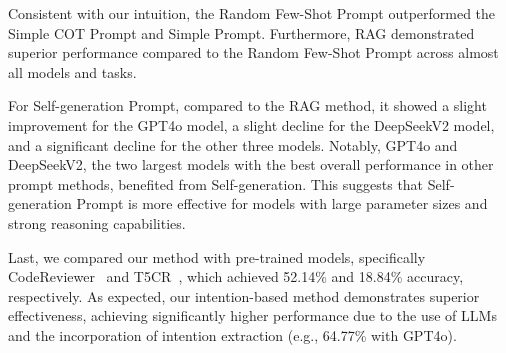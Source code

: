 Consistent with our intuition, the Random Few-Shot Prompt outperformed the Simple COT Prompt and Simple Prompt. Furthermore, RAG demonstrated superior performance compared to the Random Few-Shot Prompt across almost all models and tasks. 


For Self-generation Prompt, compared to the RAG method, it showed a slight improvement for the GPT4o model, a slight decline for the DeepSeekV2 model, and a significant decline for the other three models. Notably, GPT4o and DeepSeekV2, the two largest models with the best overall performance in other prompt methods, benefited from Self-generation. This suggests that Self-generation Prompt is more effective for models with large parameter sizes and strong reasoning capabilities. 



Last, we compared our method with pre-trained models, specifically CodeReviewer~\cite{li2022automating} and T5CR~\cite{tufano2022using}, which achieved 52.14\% and 18.84\% accuracy, respectively. As expected, our intention-based method demonstrates superior effectiveness, achieving significantly higher performance due to the use of LLMs and the incorporation of intention extraction (e.g., 64.77\% with GPT4o).




